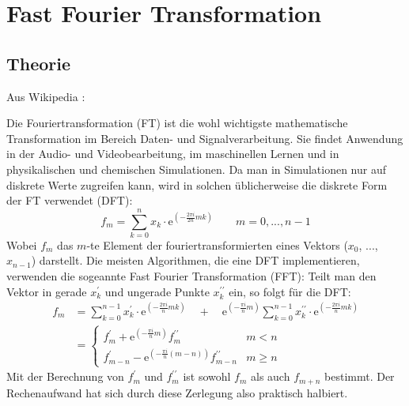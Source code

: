 	\section{Fast Fourier Transformation}
		\subsection{Theorie}
		Aus Wikipedia \autocite{wikiFFT}:
		
		Die Fouriertransformation (FT) ist die wohl wichtigste mathematische Transformation im Bereich Daten- und Signalverarbeitung. Sie findet Anwendung in der Audio- und Videobearbeitung, im maschinellen Lernen und in physikalischen und chemischen Simulationen. Da man in Simulationen nur auf diskrete Werte zugreifen kann, wird in solchen üblicherweise die diskrete Form der FT verwendet (DFT):
		\begin{equation}
			f_m = \sum^n_{k=0}x_k\cdot\mathrm{e}^{\left(-\frac{2\pi i}{2n}mk\right)}\qquad m=0,...,n-1
		\end{equation}
		Wobei $f_m$ das $m$-te Element der fouriertransformierten eines Vektors ($x_0$, ..., $x_{n-1}$) darstellt. Die meisten Algorithmen, die eine DFT implementieren, verwenden die sogeannte Fast Fourier Transformation (FFT): Teilt man den Vektor in gerade $x^{\prime}_k$ und ungerade Punkte $x^{\prime\prime}_k$ ein, so folgt für die DFT:
		\begin{align}
		f_m &= \sum_{k=0}^{n-1}x^{\prime}_k\cdot\mathrm{e}^{\left(-\frac{2\pi i}{n}mk\right)} \quad + \quad \mathrm{e}^{\left(-\frac{\pi i}{n}m\right)}\sum_{k=0}^{n-1}x^{\prime\prime}_k\cdot\mathrm{e}^{\left(-\frac{2\pi i}{n}mk\right)} \\
		&= \begin{cases} 
		f^{\prime}_m     + \mathrm{e}^{\left(-\frac{\pi i}{n}m\right)}    f^{\prime\prime}_m     & m < n \\
		f^{\prime}_{m-n} - \mathrm{e}^{\left(-\frac{\pi i}{n}(m-n)\right)}f^{\prime\prime}_{m-n} & m \geq n 
		\end{cases}
		\end{align}
		Mit der Berechnung von $f^{\prime}_m$ und $f^{\prime\prime}_m$ ist sowohl $f_m$ als auch $f_{m+n}$ bestimmt. Der Rechenaufwand hat sich durch diese Zerlegung also praktisch halbiert. 
		
